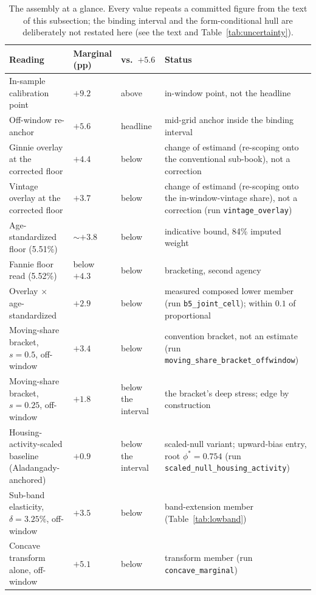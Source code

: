 \documentclass[12pt]{article}
\begin{document}
\begin{table}[H]
\centering
\caption{The assembly at a glance. Every value repeats a committed figure from the text of this subsection; the binding interval and the form-conditional hull are deliberately not restated here (see the text and Table~\ref{tab:uncertainty}).}
\label{tab:assembly}
\footnotesize
\setlength{\tabcolsep}{3.5pt}
\begin{tabular}{@{}>{\raggedright\arraybackslash}p{3.5cm}>{\raggedright\arraybackslash}p{2.1cm}>{\raggedright\arraybackslash}p{1.9cm}>{\raggedright\arraybackslash}p{6.0cm}@{}}
\toprule
Reading & Marginal (pp) & vs.\ $+5.6$ & Status \\
\midrule
In-sample calibration point & $+9.2$ & above & in-window point, not the headline \\
Off-window re-anchor & $+5.6$ & headline & mid-grid anchor inside the binding interval \\
Ginnie overlay at the corrected floor & $+4.4$ & below & change of estimand (re-scoping onto the conventional sub-book), not a correction \\
Vintage overlay at the corrected floor & $+3.7$ & below & change of estimand (re-scoping onto the in-window-vintage share), not a correction (run \texttt{vintage\_overlay}) \\
Age-standardized floor (5.51\%) & $\sim +3.8$ & below & indicative bound, 84\% imputed weight \\
Fannie floor read (5.52\%) & below $+4.3$ & below & bracketing, second agency \\
Overlay $\times$ age-standardized & $+2.9$ & below & measured composed lower member (run \texttt{b5\_joint\_cell}); within $0.1$ of proportional \\
Moving-share bracket, $s = 0.5$, off-window & $+3.4$ & below & convention bracket, not an estimate (run \texttt{moving\_share\_bracket\_offwindow}) \\
Moving-share bracket, $s = 0.25$, off-window & $+1.8$ & below the interval & the bracket's deep stress; edge by construction \\
Housing-activity-scaled baseline (Aladangady-anchored) & $+0.9$ & below the interval & scaled-null variant; upward-bias entry, root $\phi^{*} = 0.754$ (run \texttt{scaled\_null\_housing\_activity}) \\
Sub-band elasticity, $\delta = 3.25\%$, off-window & $+3.5$ & below & band-extension member (Table~\ref{tab:lowband}) \\
Concave transform alone, off-window & $+5.1$ & below & transform member (run \texttt{concave\_marginal}) \\

\end{tabular}
\end{table}
\end{document}
